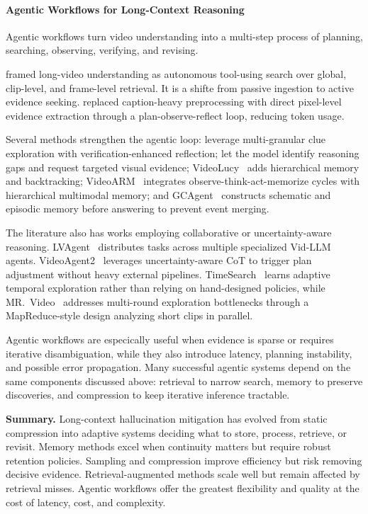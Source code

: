 \documentclass[10pt]{article} %
\begin{document}
\paragraph{Agentic Workflows for Long-Context Reasoning}

Agentic workflows turn video understanding into a multi-step process of planning, searching, observing, verifying, and revising. %

\citet{Zhang2025DeepVD} framed long-video understanding as autonomous tool-using search over global, clip-level, and frame-level retrieval. It is a shifte from passive ingestion to active evidence seeking. \citet{Wang2025ActiveVP} replaced caption-heavy preprocessing with direct pixel-level evidence extraction through a plan-observe-reflect loop, reducing token usage.

Several methods strengthen the agentic loop: \citet{Li2025PerceiveRA} leverage multi-granular clue exploration with verification-enhanced reflection; \citet{Dong2025SeeWY} let the model identify reasoning gaps and request targeted visual evidence; VideoLucy~\citep{Zuo2025VideoLucyDM} adds hierarchical memory and backtracking; VideoARM~\citep{Yin2025VideoARMAR} integrates observe-think-act-memorize cycles with hierarchical multimodal memory; and GCAgent~\citep{Yeo2025GCAgentLU} constructs schematic and episodic memory before answering to prevent event merging.

The literature also has works employing collaborative or uncertainty-aware reasoning. LVAgent~\citep{Chen2025LVAgentLV} distributes tasks across multiple specialized Vid-LLM agents. VideoAgent2~\citep{Zhi2025VideoAgent2ET} leverages uncertainty-aware CoT to trigger plan adjustment without heavy external pipelines. TimeSearch~\citep{Pan2025TimeSearchRAT} learns adaptive temporal exploration rather than relying on hand-designed policies, while MR.~Video~\citep{Pang2025MRV} addresses multi-round exploration bottlenecks through a MapReduce-style design analyzing short clips in parallel.

Agentic workflows are especically useful when evidence is sparse or requires iterative disambiguation, while they also introduce latency, planning instability, and possible error propagation. Many successful agentic systems depend on the same components discussed above: retrieval to narrow search, memory to preserve discoveries, and compression to keep iterative inference tractable.

\textbf{Summary.} Long-context hallucination mitigation has evolved from static compression into adaptive systems deciding what to store, process, retrieve, or revisit. Memory methods excel when continuity matters but require robust retention policies. Sampling and compression improve efficiency but risk removing decisive evidence. Retrieval-augmented methods scale well but remain affected by retrieval misses. Agentic workflows offer the greatest flexibility and quality at the cost of latency, cost, and complexity. %
\end{document}
